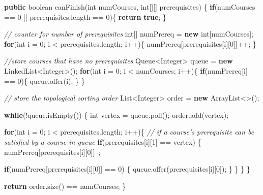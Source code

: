 \documentclass[]{book}
\newenvironment{Shaded}{\begin{snugshade}}{\end{snugshade}}
\newcommand{\BuiltInTok}[1]{#1}
\newcommand{\CommentTok}[1]{\textcolor[rgb]{0.56,0.35,0.01}{\textit{#1}}}
\newcommand{\DataTypeTok}[1]{\textcolor[rgb]{0.13,0.29,0.53}{#1}}
\newcommand{\DecValTok}[1]{\textcolor[rgb]{0.00,0.00,0.81}{#1}}
\newcommand{\FunctionTok}[1]{\textcolor[rgb]{0.00,0.00,0.00}{#1}}
\newcommand{\KeywordTok}[1]{\textcolor[rgb]{0.13,0.29,0.53}{\textbf{#1}}}
\newcommand{\NormalTok}[1]{#1}
\begin{document}
\begin{Shaded}
\begin{Highlighting}[]
\KeywordTok{public} \DataTypeTok{boolean} \FunctionTok{canFinish}\NormalTok{(}\DataTypeTok{int}\NormalTok{ numCourses, }\DataTypeTok{int}\NormalTok{[][] prerequisites) \{}
    \KeywordTok{if}\NormalTok{(numCourses == }\DecValTok{0}\NormalTok{ || prerequisites.}\FunctionTok{length}\NormalTok{ == }\DecValTok{0}\NormalTok{)\{}
        \KeywordTok{return} \KeywordTok{true}\NormalTok{;}
\NormalTok{    \}}

    \CommentTok{// counter for number of prerequisites}
    \DataTypeTok{int}\NormalTok{[] numPrereq = }\KeywordTok{new} \DataTypeTok{int}\NormalTok{[numCourses];}
    \KeywordTok{for}\NormalTok{(}\DataTypeTok{int}\NormalTok{ i = }\DecValTok{0}\NormalTok{; i < prerequisites.}\FunctionTok{length}\NormalTok{; i++)\{}
\NormalTok{        numPrereq[prerequisites[i][}\DecValTok{0}\NormalTok{]]++;}
\NormalTok{    \}}

    \CommentTok{//store courses that have no prerequisites}
    \BuiltInTok{Queue}\NormalTok{<}\BuiltInTok{Integer}\NormalTok{> queue = }\KeywordTok{new} \BuiltInTok{LinkedList}\NormalTok{<}\BuiltInTok{Integer}\NormalTok{>();}
        \KeywordTok{for}\NormalTok{(}\DataTypeTok{int}\NormalTok{ i = }\DecValTok{0}\NormalTok{; i < numCourses; i++)\{}
        \KeywordTok{if}\NormalTok{(numPrereq[i] == }\DecValTok{0}\NormalTok{)\{}
\NormalTok{            queue.}\FunctionTok{offer}\NormalTok{(i);}
\NormalTok{        \}}
\NormalTok{    \}}

    \CommentTok{// store the topological sorting order}
    \BuiltInTok{List}\NormalTok{<}\BuiltInTok{Integer}\NormalTok{> order = }\KeywordTok{new} \BuiltInTok{ArrayList}\NormalTok{<>();}

    \KeywordTok{while}\NormalTok{(!queue.}\FunctionTok{isEmpty}\NormalTok{()) \{}
        \DataTypeTok{int}\NormalTok{ vertex = queue.}\FunctionTok{poll}\NormalTok{();}
\NormalTok{        order.}\FunctionTok{add}\NormalTok{(vertex);}

        \KeywordTok{for}\NormalTok{(}\DataTypeTok{int}\NormalTok{ i = }\DecValTok{0}\NormalTok{; i < prerequisites.}\FunctionTok{length}\NormalTok{; i++)\{}
            \CommentTok{// if a course's prerequisite can be satisfied by a course in queue}
            \KeywordTok{if}\NormalTok{(prerequisites[i][}\DecValTok{1}\NormalTok{] == vertex) \{}
\NormalTok{                numPrereq[prerequisites[i][}\DecValTok{0}\NormalTok{]]--;}

                \KeywordTok{if}\NormalTok{(numPrereq[prerequisites[i][}\DecValTok{0}\NormalTok{]] == }\DecValTok{0}\NormalTok{) \{}
\NormalTok{                    queue.}\FunctionTok{offer}\NormalTok{(prerequisites[i][}\DecValTok{0}\NormalTok{]);}
\NormalTok{                \}}
\NormalTok{            \}}
\NormalTok{        \}}
\NormalTok{    \}}

    \KeywordTok{return}\NormalTok{ order.}\FunctionTok{size}\NormalTok{() == numCourses;}
\NormalTok{\}}
\end{Highlighting}
\end{Shaded}
\end{document}
